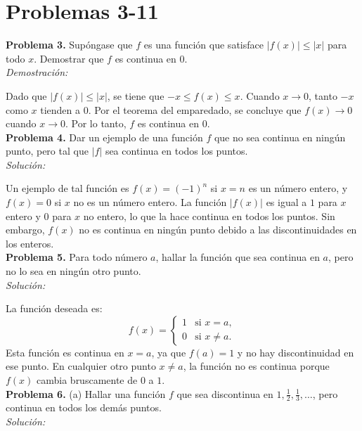 \section*{Problemas 3-11}

\textbf{Problema 3.}
Supóngase que $f$ es una función que satisface $|f(x)| \leq |x|$ para todo $x$. Demostrar que $f$ es continua en $0$.\\

\textit{Demostración:}

Dado que $|f(x)| \leq |x|$, se tiene que $-x \leq f(x) \leq x$. Cuando $x \to 0$, tanto $-x$ como $x$ tienden a $0$. Por el teorema del emparedado, se concluye que $f(x) \to 0$ cuando $x \to 0$. Por lo tanto, $f$ es continua en $0$.\\

\textbf{Problema 4.}
Dar un ejemplo de una función $f$ que no sea continua en ningún punto, pero tal que $|f|$ sea continua en todos los puntos.\\

\textit{Solución:}

Un ejemplo de tal función es $f(x) = (-1)^n$ si $x = n$ es un número entero, y $f(x) = 0$ si $x$ no es un número entero. La función $|f(x)|$ es igual a $1$ para $x$ entero y $0$ para $x$ no entero, lo que la hace continua en todos los puntos. Sin embargo, $f(x)$ no es continua en ningún punto debido a las discontinuidades en los enteros.\\

\textbf{Problema 5.}
Para todo número $a$, hallar la función que sea continua en $a$, pero no lo sea en ningún otro punto.\\

\textit{Solución:}

La función deseada es:
\[
    f(x) = \begin{cases}
    1 & \text{si } x = a, \\
    0 & \text{si } x \neq a.
    \end{cases}
\]
Esta función es continua en $x = a$, ya que $f(a) = 1$ y no hay discontinuidad en ese punto. En cualquier otro punto $x \neq a$, la función no es continua porque $f(x)$ cambia bruscamente de $0$ a $1$.\\

\textbf{Problema 6.}
(a) Hallar una función $f$ que sea discontinua en $1, \frac{1}{2}, \frac{1}{3}, \dots$, pero continua en todos los demás puntos.\\

\textit{Solución:}

